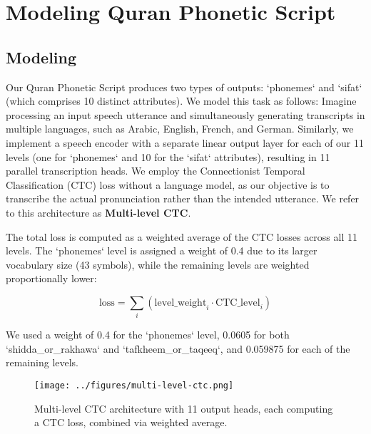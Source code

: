 
\chapter{Modeling Quran Phonetic Script} %

\label{Chapter5} %





\section{Modeling}

Our Quran Phonetic Script produces two types of outputs: `phonemes` and `sifat` (which comprises 10 distinct attributes). We model this task as follows: Imagine processing an input speech utterance and simultaneously generating transcripts in multiple languages, such as Arabic, English, French, and German. Similarly, we implement a speech encoder with a separate linear output layer for each of our 11 levels (one for `phonemes` and 10 for the `sifat` attributes), resulting in 11 parallel transcription heads. We employ the Connectionist Temporal Classification (CTC) loss \cite{graves2006ctc} without a language model, as our objective is to transcribe the actual pronunciation rather than the intended utterance. We refer to this architecture as \textbf{Multi-level CTC}.

The total loss is computed as a weighted average of the CTC losses across all 11 levels. The `phonemes` level is assigned a weight of 0.4 due to its larger vocabulary size (43 symbols), while the remaining levels are weighted proportionally lower:

\begin{equation}
\text{loss} = \sum_{i} \left( \text{level\_weight}_i \cdot \text{CTC\_level}_i \right)
\label{eq:multilevel_ctc}
\end{equation}

We used a weight of 0.4 for the `phonemes` level, 0.0605 for both `shidda_or_rakhawa` and `tafkheem_or_taqeeq`, and 0.059875 for each of the remaining levels.

\begin{figure}[H]
\centering
\texttt{[image: ../figures/multi-level-ctc.png]}
\caption{Multi-level CTC architecture with 11 output heads, each computing a CTC loss, combined via weighted average.}
\label{fig:multi_level_ctc}
\end{figure}

